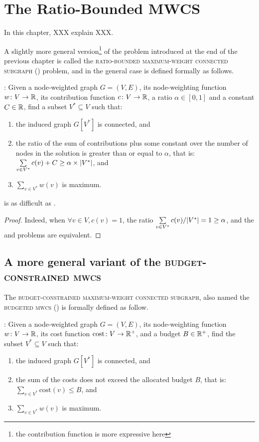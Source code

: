 \chapter{The Ratio-Bounded MWCS}
\label{chap:rbmwcs}

	In this chapter, XXX explain XXX.

	A slightly more general version\footnote{the contribution function is more expressive here} of the problem introduced at the end of the previous chapter is called the \textsc{ratio-bounded maximum-weight connected subgraph} (\rbmwcs) problem, and in the general case is defined formally as follows.

	\textbf{\rbmwcs{}}: Given a node-weighted graph $G = (V, E)$, its node-weighting function $w\colon V \to \mathbb{R}$, its contribution function $c\colon V \to \mathbb{R}$, a ratio $\alpha \in [0,1]$ and a constant $C \in \mathbb{R}$, find a subset $V^* \subseteq V$ such that:
	\begin{enumerate}
		\item the induced graph $G\left[V^*\right]$ is connected, and
		\item the ratio of the sum of contributions plus some constant over the number of nodes in the solution is greater than or equal to $\alpha$, that is:\\
			$\sum\limits_{v \in V^*}{c(v)} + C \geq \alpha\times\lvert V^*\rvert$, and
		\item $\sum\limits_{v \in V^*}{w(v)}$ is maximum.
	\end{enumerate}

	\begin{proposition}
		\rbmwcs{} is as difficult as \mwcs{}.
	\end{proposition}
	\begin{proof}
		Indeed, when $\forall v\in V, c(v) = 1$, the ratio $\sum\limits_{v \in V^*}{c(v)} / \lvert V^*\rvert = 1 \geq \alpha$, and the \mwcs{} and \rbmwcs{} problems are equivalent.
	\end{proof}

	\section{A more general variant of the \textsc{budget-constrained mwcs}}
		The \textsc{budget-constrained maximum-weight connected subgraph}, also named the \textsc{budgeted mwcs} (\bcmwcs{}) is formally defined as follow.
		
		\textbf{\bcmwcs{}}: Given a node-weighted graph $G = (V, E)$, its node-weighting function $w\colon V \to \mathbb{R}$, its cost function $\text{cost}\colon V \to \mathbb{R}^+$, and a budget $B \in \mathbb{R}^+$, find the subset $V^* \subseteq V$ such that:
		\begin{enumerate}
			\item the induced graph $G\left[V^*\right]$ is connected, and
			\item the sum of the costs does not exceed the allocated budget $B$, that is:\\
				$\sum\limits_{v \in V^*}{\text{cost}(v)} \leq B$, and
			\item $\sum\limits_{v \in V^*}{w(v)}$ is maximum.
		\end{enumerate}

